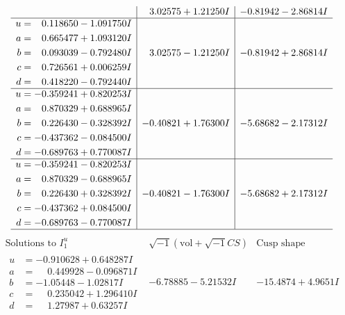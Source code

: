 \documentclass[1p]{elsarticle_modified}
\theoremstyle{definition}
\newcommand{\I}{\sqrt{-1}}
\begin{document}
$$\begin{array}{c|c|c}
 & \phantom{-}3.02575 + 1.21250 I & -0.81942 - 2.86814 I \\ \hline\begin{aligned}
u &= \phantom{-}0.118650 - 1.091750 I \\
a &= \phantom{-}0.665477 + 1.093120 I \\
b &= \phantom{-}0.093039 - 0.792480 I \\
c &= \phantom{-}0.726561 + 0.006259 I \\
d &= \phantom{-}0.418220 - 0.792440 I\end{aligned}
 & \phantom{-}3.02575 - 1.21250 I & -0.81942 + 2.86814 I \\ \hline\begin{aligned}
u &= -0.359241 + 0.820253 I \\
a &= \phantom{-}0.870329 + 0.688965 I \\
b &= \phantom{-}0.226430 - 0.328392 I \\
c &= -0.437362 - 0.084500 I \\
d &= -0.689763 + 0.770087 I\end{aligned}
 & -0.40821 + 1.76300 I & -5.68682 - 2.17312 I \\ \hline\begin{aligned}
u &= -0.359241 - 0.820253 I \\
a &= \phantom{-}0.870329 - 0.688965 I \\
b &= \phantom{-}0.226430 + 0.328392 I \\
c &= -0.437362 + 0.084500 I \\
d &= -0.689763 - 0.770087 I\end{aligned}
 & -0.40821 - 1.76300 I & -5.68682 + 2.17312 I\\
 \hline 
 \end{array}$$\newpage$$\begin{array}{c|c|c}  
\text{Solutions to }I^u_{1}& \I (\text{vol} + \sqrt{-1}CS) & \text{Cusp shape}\\
 \hline 
\begin{aligned}
u &= -0.910628 + 0.648287 I \\
a &= \phantom{-}0.449928 - 0.096871 I \\
b &= -1.05448 - 1.02817 I \\
c &= \phantom{-}0.235042 + 1.296410 I \\
d &= \phantom{-}1.27987 + 0.63257 I\end{aligned}
 & -6.78885 - 5.21532 I & -15.4874 + 4.9651 I \\ \hline\begin{aligned}

\end{aligned}
\end{array}$$
\end{document}
